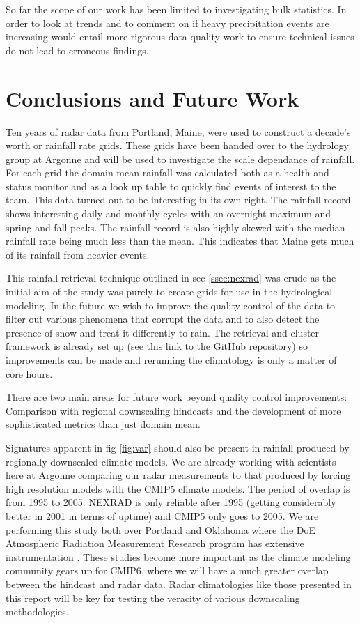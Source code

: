 \documentclass[twocol]{ametsoc}
\begin{document}
 So far the scope of our work has been limited to investigating bulk statistics. In order to look at trends and to comment on if 
 heavy precipitation events are increasing would entail more rigorous data quality work to ensure technical issues do not lead 
 to erroneous findings. 

\section{Conclusions and Future Work}
Ten years of radar data from Portland, Maine, were used to construct a decade's worth or rainfall rate grids. These grids have 
been handed over to the hydrology group at Argonne and will be used to investigate the scale dependance of rainfall. For each 
grid the domain mean rainfall was calculated both as a health and status monitor and as a look up table to quickly find events of 
interest to the team. This data turned out to be interesting in its own right. The rainfall record shows interesting daily and monthly 
cycles with an overnight maximum  and spring and fall peaks. The rainfall record is also highly skewed with the median rainfall rate
being much less than the mean. This indicates that Maine gets much of its rainfall from heavier events. 

This rainfall retrieval technique outlined in sec \ref{ssec:nexrad} was crude as the initial aim of the study was purely to create grids 
for use in the hydrological modeling.  In the future we wish to improve the quality control of the data to filter out various phenomena 
that corrupt the data and to also detect the presence of snow and treat it differently to rain. The retrieval and cluster framework is 
already set up (see \href{https://github.com/scollis/high_resolution_hydrology}{this link to the GitHub repository})
 so improvements can be made and rerunning the climatology is only a matter of core hours.
 
There are two main areas for future work beyond quality control improvements: Comparison with regional downscaling hindcasts and 
the development of more sophisticated metrics than just domain mean. 

Signatures apparent in fig \ref{fig:var} should also be present in rainfall produced by regionally downscaled climate models. We are already 
working with scientists here at Argonne comparing our radar measurements to that produced by forcing high resolution models with the 
CMIP5 climate models. The period of overlap is from 1995 to 2005. NEXRAD is only reliable after 1995 (getting considerably better in 2001 in 
terms of uptime) and CMIP5 only goes to 2005. We are performing this study both over Portland and Oklahoma where the DoE Atmospheric 
Radiation Measurement Research program has extensive instrumentation \cite{ackerman_atmospheric_2003}. These studies become more 
important as the climate modeling community gears up for CMIP6, where we will have a much greater overlap between the hindcast and radar
 data. Radar climatologies like those presented in this report will be key for testing the veracity of various downscaling methodologies. 
\end{document}

